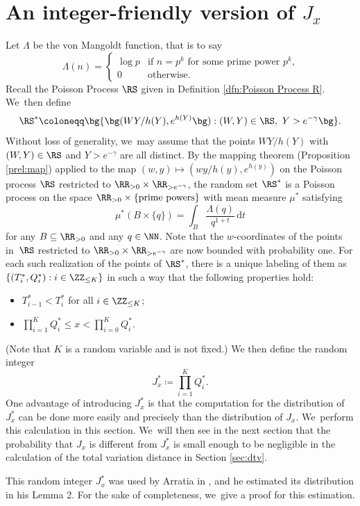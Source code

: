 \section{An integer-friendly version of \texorpdfstring{$J_x$}{Jx}}
\label{sec:integer friendly J}

Let $\Lambda$ be the von Mangoldt function, that is to say
\[
\Lambda(n) = \begin{cases}
\log p &\text{if $n = p^k$ for some prime power $p^k$,} \\
0 &\text{otherwise.}
\end{cases}
\]
Recall the Poisson Process $\RS$ given in Definition \ref{dfn:Poisson Process R}. We~then define
\[
\RS^* \coloneqq \bg\{ \bg( WY/ h(Y), e^{h(Y)} \bg): (W,Y)\in \RS,\ Y > e^{-\gamma}\bg\}.
\]
Without loss of generality, we~may assume that the points $WY/h(Y)$ with $(W,Y)\in\RS$ and $Y>e^{-\gamma}$ are all distinct. By the mapping theorem (Proposition \ref{prel:map}) applied to the map $(w,y)\mapsto (wy/h(y),e^{h(y)})$ on the Poisson process $\RS$ restricted to $\RR_{>0} \times \RR_{>e^{-\gamma}}$, the random set $\RS^*$ is a Poisson process on the space $\RR_{>0}\times \{\text{prime powers}\}$ with mean measure $\mu^*$ satisfying
\[
\mu^*(B \times \{q\}) = \int_{B} \frac{\Lambda(q)}{q^{1+t}} \, \mathrm dt
\]
for any $B\subseteq\RR_{>0}$ and any $q\in\NN$. Note that the $w$-coordinates of the points in~$\RS$ restricted to $\RR_{>0} \times \RR_{>e^{-\gamma}}$ are now bounded with probability one. For each such realization of the points of $\RS^*$, there is a unique labeling of them as \hbox{$\{(T^*_i, Q^*_i):i \in \ZZ_{\le K}\}$} in such a way that the following properties hold:
\begin{itemize}
\item $T^*_{i-1} <T^*_{i}$ for all $i\in\ZZ_{\le K}$;
\item $\prod_{i=1}^K Q_i^*\le x< \prod_{i=0}^K Q_i^*$.
\end{itemize}
(Note that $K$ is a random variable and is not fixed.) We then define the random integer
\[
J_x^*\coloneqq \prod_{i=1}^K Q^*_i.
\]
One advantage of introducing $J_x^*$ is that the computation for the distribution of $J_x^*$ can be done more easily and precisely than the distribution of $J_x$. We~perform this calculation in this section. We~will then see in the next section that the probability that $J_x$ is different from $J_x^*$ is small enough to be negligible in the calculation of the total variation distance in Section \ref{sec:dtv}.

This random integer $J^*_x$ was used by Arratia in \cite{Arratia02}, and he estimated its distribution in his Lemma 2. For the sake of completeness, we~give a proof for this estimation.

